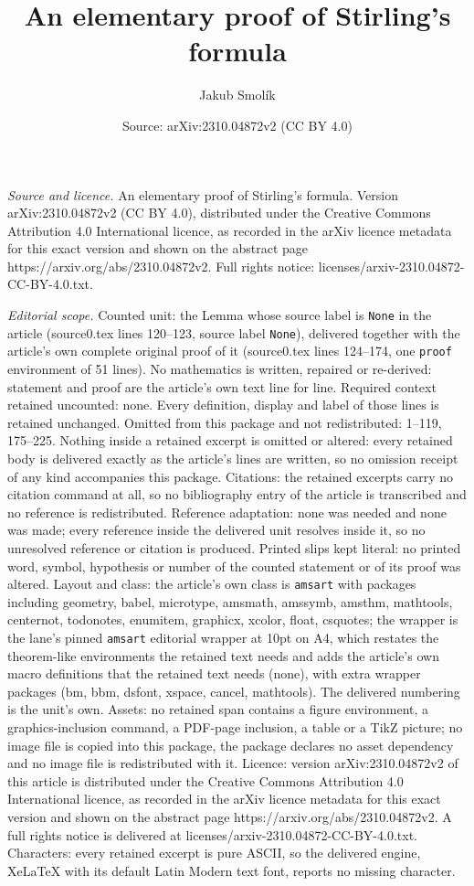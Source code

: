 \documentclass[10pt,a4paper]{amsart}
\title[An elementary proof of Stirling's formula]{An elementary proof of Stirling's formula}
\author{Jakub Smol\'ik}
\date{Source: arXiv:2310.04872v2 (CC BY 4.0)}
\begin{document}
\maketitle

\noindent\emph{Source and licence.} An elementary proof of Stirling's formula. Version arXiv:2310.04872v2 (CC BY 4.0), distributed under the Creative Commons Attribution 4.0 International licence, as recorded in the arXiv licence metadata for this exact version and shown on the abstract page https://arxiv.org/abs/2310.04872v2. Full rights notice: licenses/arxiv-2310.04872-CC-BY-4.0.txt.\par\smallskip

\noindent\textit{Editorial scope.} Counted unit: the Lemma whose source label is \texttt{None} in the article (source0.tex lines 120--123, source label \texttt{None}), delivered together with the article's own complete original proof of it (source0.tex lines 124--174, one \texttt{proof} environment of 51 lines). No mathematics is written, repaired or re-derived: statement and proof are the article's own text line for line. Required context retained uncounted: none. Every definition, display and label of those lines is retained unchanged. Omitted from this package and not redistributed: 1--119, 175--225. Nothing inside a retained excerpt is omitted or altered: every retained body is delivered exactly as the article's lines are written, so no omission receipt of any kind accompanies this package. Citations: the retained excerpts carry no citation command at all, so no bibliography entry of the article is transcribed and no reference is redistributed. Reference adaptation: none was needed and none was made; every reference inside the delivered unit resolves inside it, so no unresolved reference or citation is produced. Printed slips kept literal: no printed word, symbol, hypothesis or number of the counted statement or of its proof was altered. Layout and class: the article's own class is \texttt{amsart} with packages including geometry, babel, microtype, amsmath, amssymb, amsthm, mathtools, centernot, todonotes, enumitem, graphicx, xcolor, float, csquotes; the wrapper is the lane's pinned \texttt{amsart} editorial wrapper at 10pt on A4, which restates the theorem-like environments the retained text needs and adds the article's own macro definitions that the retained text needs (none), with extra wrapper packages (bm, bbm, dsfont, xspace, cancel, mathtools). The delivered numbering is the unit's own. Assets: no retained span contains a figure environment, a graphics-inclusion command, a PDF-page inclusion, a table or a TikZ picture; no image file is copied into this package, the package declares no asset dependency and no image file is redistributed with it. Licence: version arXiv:2310.04872v2 of this article is distributed under the Creative Commons Attribution 4.0 International licence, as recorded in the arXiv licence metadata for this exact version and shown on the abstract page https://arxiv.org/abs/2310.04872v2. A full rights notice is delivered at licenses/arxiv-2310.04872-CC-BY-4.0.txt. Characters: every retained excerpt is pure ASCII, so the delivered engine, XeLaTeX with its default Latin Modern text font, reports no missing character.
\end{document}

